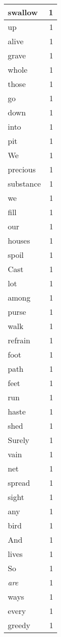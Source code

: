 \begin{center}
\begin{longtable}{l|r}
swallow & 1\\ \hline 
up & 1\\ \hline 
alive & 1\\ \hline 
grave & 1\\ \hline 
whole & 1\\ \hline 
those & 1\\ \hline 
go & 1\\ \hline 
down & 1\\ \hline 
into & 1\\ \hline 
pit & 1\\ \hline 
We & 1\\ \hline 
precious & 1\\ \hline 
substance & 1\\ \hline 
we & 1\\ \hline 
fill & 1\\ \hline 
our & 1\\ \hline 
houses & 1\\ \hline 
spoil & 1\\ \hline 
Cast & 1\\ \hline 
lot & 1\\ \hline 
among & 1\\ \hline 
purse & 1\\ \hline 
walk & 1\\ \hline 
refrain & 1\\ \hline 
foot & 1\\ \hline 
path & 1\\ \hline 
feet & 1\\ \hline 
run & 1\\ \hline 
haste & 1\\ \hline 
shed & 1\\ \hline 
Surely & 1\\ \hline 
vain & 1\\ \hline 
net & 1\\ \hline 
spread & 1\\ \hline 
sight & 1\\ \hline 
any & 1\\ \hline 
bird & 1\\ \hline 
And & 1\\ \hline 
lives & 1\\ \hline 
So & 1\\ \hline 
\emph{are} & 1\\ \hline 
ways & 1\\ \hline 
every & 1\\ \hline 
greedy & 1\\ \hline 

\end{longtable}
\end{center}

